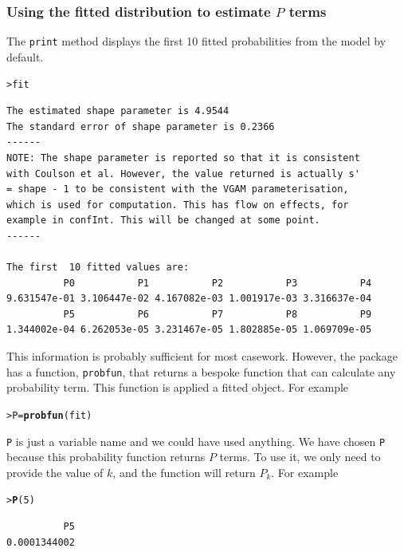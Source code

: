 \documentclass{article}\usepackage[]{graphicx}\usepackage[]{xcolor}
\makeatletter
\newcommand{\hlnum}[1]{\textcolor[rgb]{0.686,0.059,0.569}{#1}}%
\newcommand{\hldef}[1]{\textcolor[rgb]{0.345,0.345,0.345}{#1}}%
\newcommand{\hlkwb}[1]{\textcolor[rgb]{0.69,0.353,0.396}{#1}}%
\newcommand{\hlkwd}[1]{\textcolor[rgb]{0.737,0.353,0.396}{\textbf{#1}}}%
\newenvironment{kframe}{%
 \def\at@end@of@kframe{}%
 \ifinner\ifhmode%
  \def\at@end@of@kframe{\end{minipage}}%
  \begin{minipage}{\columnwidth}%
 \fi\fi%
 \def\FrameCommand##1{\hskip\@totalleftmargin \hskip-\fboxsep
 \colorbox{shadecolor}{##1}\hskip-\fboxsep
     \hskip-\linewidth \hskip-\@totalleftmargin \hskip\columnwidth}%
 \MakeFramed {\advance\hsize-\width
   \@totalleftmargin\z@ \linewidth\hsize
   \@setminipage}}%
 {\par\unskip\endMakeFramed%
 \at@end@of@kframe}
\newenvironment{knitrout}{}{} %
\newcommand{\rcode}[1]{\lstinline[language=R,basicstyle=\normalsize\ttfamily]!#1!}
\makeatother
\begin{document}
\subsubsection{Using the fitted distribution to estimate $P$ terms}
The \rcode{print} method displays the first 10 fitted probabilities from the model by default.
\begin{knitrout}
\color{fgcolor}\begin{kframe}
\begin{alltt}
\hldef{> }\hldef{fit}
\end{alltt}
\begin{verbatim}
The estimated shape parameter is 4.9544 
The standard error of shape parameter is 0.2366 
------
NOTE: The shape parameter is reported so that it is consistent
with Coulson et al. However, the value returned is actually s'
= shape - 1 to be consistent with the VGAM parameterisation,
which is used for computation. This has flow on effects, for
example in confInt. This will be changed at some point.
------

The first  10 fitted values are:
          P0           P1           P2           P3           P4 
9.631547e-01 3.106447e-02 4.167082e-03 1.001917e-03 3.316637e-04 
          P5           P6           P7           P8           P9 
1.344002e-04 6.262053e-05 3.231467e-05 1.802885e-05 1.069709e-05 
\end{verbatim}
\end{kframe}
\end{knitrout}\noindent
This information is probably sufficient for most casework. However, the package has a function, \rcode{probfun}, that returns a bespoke function that can calculate any probability term. This function is applied a fitted object. For example
\begin{knitrout}
\color{fgcolor}\begin{kframe}
\begin{alltt}
\hldef{> }\hldef{P} \hlkwb{=} \hlkwd{probfun}\hldef{(fit)}
\end{alltt}
\end{kframe}
\end{knitrout}\noindent
\rcode{P} is just a variable name and we could have used anything. We have chosen \rcode{P} because this probability function returns $P$ terms. To use it, we only need to provide the value of $k$, and the function will return $P_k$. For example
\begin{knitrout}
\color{fgcolor}\begin{kframe}
\begin{alltt}
\hldef{> }\hlkwd{P}\hldef{(}\hlnum{5}\hldef{)}
\end{alltt}
\begin{verbatim}
          P5 
0.0001344002 
\end{verbatim}
\end{kframe}
\end{knitrout}\noindent
\end{document}

